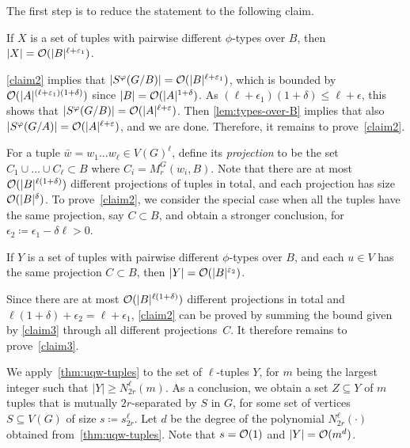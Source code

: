 	\setcounter{claim}{0}
	
The first step is to reduce the statement to the following claim.

\begin{claim}\label{claim2}
If $X$ is a set of tuples with pairwise different $\phi$-types over $B$, then $|X|=\mathcal{O}(|B|^{\ell+\varepsilon_1})$.
\end{claim}	

\cref{claim2} implies that $|S^\varphi(G/B)|=\mathcal{O}(|B|^{\ell+\varepsilon_1})$, 
which is bounded by $\mathcal{O}(|A|^{(\ell+\varepsilon_1)(1+\delta)})$ since $|B|=\mathcal{O}(|A|^{1+\delta})$. As $(\ell+\epsilon_1)(1+\delta)\le \ell+\epsilon$, this shows that $|S^\varphi(G/B)|=\mathcal{O}(|A|^{\ell+\varepsilon})$.
Then \cref{lem:types-over-B} implies that also $|S^\varphi(G/A)|=\mathcal{O}(|A|^{\ell+\varepsilon})$, and we are done. Therefore, it remains to prove~\cref{claim2}.

\medskip

For a tuple $\bar w=w_1\ldots w_\ell\in V(G)^\ell$, define its \emph{projection}
to be the set $C_1\cup\ldots\cup C_\ell\subset B$ where  
$C_i=M^G_r(w_i, B)$. Note that there are at most 
$\mathcal{O}(|B|^{\ell(1+\delta)})$ different projections of tuples in total, and each projection has size $\mathcal{O}(|B|^\delta)$.
To prove~\cref{claim2}, we consider the special case when all the tuples have the same projection, say $C\subset B$, and  obtain a stronger conclusion,
for $\epsilon_2\coloneqq \epsilon_1-\delta\ell>0$.

\begin{claim}\label{claim3}
If $Y$ is a set of tuples with pairwise different $\phi$-types over $B$, and each $u\in V$ has the same projection $C\subset B$, then $|Y|=\mathcal{O}(|B|^{\varepsilon_2})$.
\end{claim}

Since there are at most $\mathcal{O}(|B|^{\ell(1+\delta)})$ different projections in total and $\ell(1+\delta)+\epsilon_2=\ell+\epsilon_1$, \cref{claim2} can be proved
by summing the bound given by \cref{claim3} through all different projections~$C$.
It therefore remains to prove~\cref{claim3}.

\medskip

We apply~\cref{thm:uqw-tuples} to the set of $\ell$-tuples $Y$, for $m$ being the largest integer such that $|Y|\ge N^{\ell}_{2r}(m)$.
  As a conclusion, we obtain a set $Z\subseteq Y$ of $m$ tuples that is mutually $2r$-separated by $S$ in $G$, for some set of vertices $S\subseteq V(G)$ of size $s\coloneqq s^{\ell}_{2r}$.
  Let $d$ be the degree of the polynomial $N^\ell_{2r}(\cdot)$ obtained from~\cref{thm:uqw-tuples}.
  Note that $s=\mathcal{O}(1)$ and $|Y|=\mathcal{O}(m^d)$.
    
